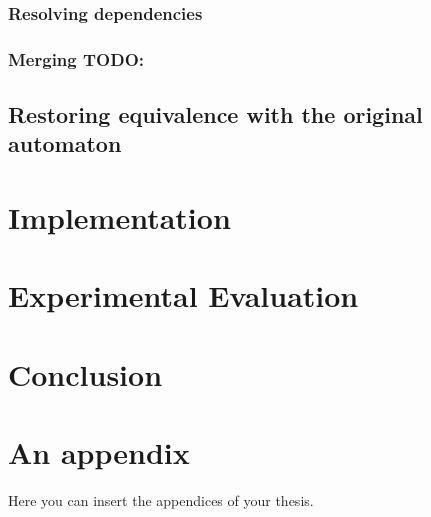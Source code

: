 \documentclass[
  digital, %
  twoside, %
  table,   %
  lof,     %
  lot,     %
]{fithesis3}
\begin{document}
\subsection{Resolving dependencies}

\subsection{Merging TODO:}


\section{Restoring equivalence with the original automaton}
\label{sec:restore_equiv}

\chapter{Implementation}

\chapter{Experimental Evaluation}

\chapter{Conclusion}

\printbibliography[heading=bibintoc]

\makeatletter\thesis@blocks@clear\makeatother
{}
{} 
\printindex

\appendix
\chapter{An appendix}
Here you can insert the appendices of your thesis.
\end{document}
